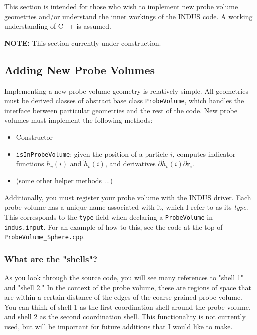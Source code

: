 \documentclass[11pt,notitlepage]{article}
\begin{document}
This section is intended for those who wish to implement new probe volume geometries and/or understand the inner workings of the INDUS code. A working understanding of C++ is assumed. 

\textbf{NOTE:} This section currently under construction.


\subsection{Adding New Probe Volumes}

Implementing a new probe volume geometry is relatively simple. All geometries must be derived classes of abstract base class \texttt{ProbeVolume}, which handles the interface between particular geometries and the rest of the code. New probe volumes must implement the following methods:

\begin{itemize}
	\item Constructor
	\item \texttt{isInProbeVolume}: given the position of a particle $i$, computes indicator functions $h_v(i)$ and $\tilde{h}_v(i)$, and derivatives $\partial \tilde{h}_v(i) \partial \mathbf{r}_i$.
	\item (some other helper methods ...)
\end{itemize}

Additionally, you must register your probe volume with the INDUS driver. Each probe volume has a unique name associated with it, which I refer to as its \emph{type}. This corresponds to the \texttt{type} field when declaring a \texttt{ProbeVolume} in \texttt{indus.input}. For an example of how to this, see the code at the top of \texttt{ProbeVolume\_Sphere.cpp}.


\subsubsection{What are the "shells"?}

As you look through the source code, you will see many references to "shell 1" and "shell 2." In the context of the probe volume, these are regions of space that are within a certain distance of the edges of the coarse-grained probe volume. You can think of shell 1 as the first coordination shell around the probe volume, and shell 2 as the second coordination shell. This functionality is not currently used, but will be important for future additions that I would like to make.
\end{document}
